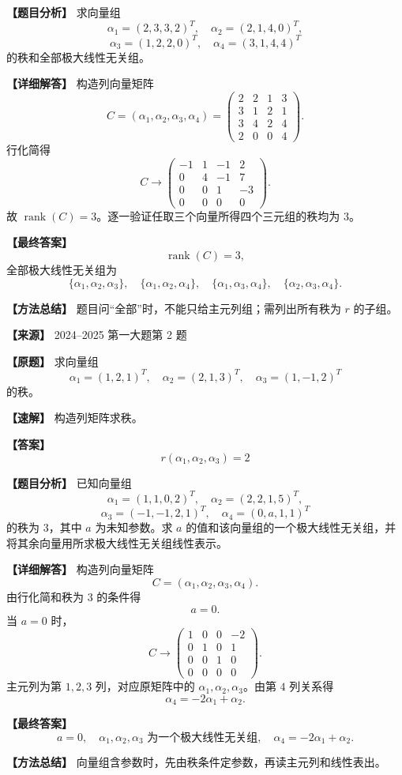 \documentclass[11pt,a4paper,UTF8]{ctexart}
\newcommand{\rank}{\operatorname{rank}}
\begin{document}
\begin{answerbox}
\textbf{【题目分析】} 求向量组
\[
\alpha_1=(2,3,3,2)^T,\quad
\alpha_2=(2,1,4,0)^T,
\]
\[
\alpha_3=(1,2,2,0)^T,\quad
\alpha_4=(3,1,4,4)^T
\]
的秩和全部极大线性无关组。

\textbf{【详细解答】} 构造列向量矩阵
\[
C=(\alpha_1,\alpha_2,\alpha_3,\alpha_4)
=\begin{pmatrix}
2&2&1&3\\
3&1&2&1\\
3&4&2&4\\
2&0&0&4
\end{pmatrix}.
\]
行化简得
\[
C\to
\begin{pmatrix}
-1&1&-1&2\\
0&4&-1&7\\
0&0&1&-3\\
0&0&0&0
\end{pmatrix}.
\]
故 $\rank(C)=3$。逐一验证任取三个向量所得四个三元组的秩均为 $3$。

\textbf{【最终答案】}
\[
\rank(C)=3,
\]
全部极大线性无关组为
\[
\{\alpha_1,\alpha_2,\alpha_3\},\quad
\{\alpha_1,\alpha_2,\alpha_4\},\quad
\{\alpha_1,\alpha_3,\alpha_4\},\quad
\{\alpha_2,\alpha_3,\alpha_4\}.
\]

\textbf{【方法总结】} 题目问“全部”时，不能只给主元列组；需列出所有秩为 $r$ 的子组。
\end{answerbox}

\begin{answerbox}
\textbf{【来源】} 2024--2025 第一大题第 2 题

\textbf{【原题】}
求向量组
\[
\alpha_1=(1,2,1)^T,\quad \alpha_2=(2,1,3)^T,\quad \alpha_3=(1,-1,2)^T
\]
的秩。

\textbf{【速解】}
构造列矩阵求秩。

\textbf{【答案】}
\[r(\alpha_1,\alpha_2,\alpha_3)=2\]
\end{answerbox}

\begin{answerbox}
\textbf{【题目分析】} 已知向量组
\[
\alpha_1=(1,1,0,2)^T,\quad
\alpha_2=(2,2,1,5)^T,
\]
\[
\alpha_3=(-1,-1,2,1)^T,\quad
\alpha_4=(0,a,1,1)^T
\]
的秩为 $3$，其中 $a$ 为未知参数。求 $a$ 的值和该向量组的一个极大线性无关组，并将其余向量用所求极大线性无关组线性表示。

\textbf{【详细解答】} 构造列向量矩阵
\[
C=(\alpha_1,\alpha_2,\alpha_3,\alpha_4).
\]
由行化简和秩为 $3$ 的条件得
\[
a=0.
\]
当 $a=0$ 时，
\[
C\to
\begin{pmatrix}
1&0&0&-2\\
0&1&0&1\\
0&0&1&0\\
0&0&0&0
\end{pmatrix}.
\]
主元列为第 $1,2,3$ 列，对应原矩阵中的 $\alpha_1,\alpha_2,\alpha_3$。由第 $4$ 列关系得
\[
\alpha_4=-2\alpha_1+\alpha_2.
\]

\textbf{【最终答案】}
\[
a=0,\quad \alpha_1,\alpha_2,\alpha_3\text{ 为一个极大线性无关组},
\quad \alpha_4=-2\alpha_1+\alpha_2.
\]

\textbf{【方法总结】} 向量组含参数时，先由秩条件定参数，再读主元列和线性表出。
\end{answerbox}
\end{document}
